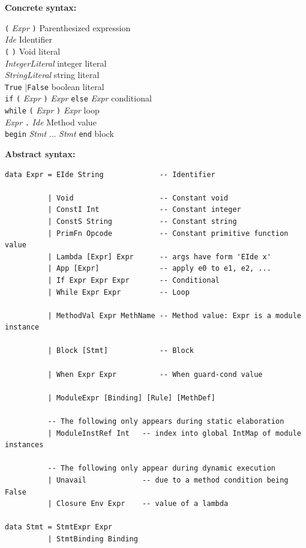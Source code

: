 \documentclass[11pt]{article}
\newcommand{\hm}{\hspace*{1em}}
\newcommand{\nterm}[1]{\emph{#1}}
\newcommand{\term}[1]{\texttt{#1}}
\newcommand{\many}[2]{#1 #2 ... #2 #1}
\newcommand{\alt}{{$\mid$}}
\newcommand{\gram}[2]{    \hm\makebox[10em][l]{\it #1}\makebox[1.5em][l]{::=}    #2}
\newcommand{\grammore}[1]{\hm\makebox[10em][l]{      }\makebox[1.5em][l]{}       #1}
\begin{document}
{\bf Concrete syntax:}

\gram{Expr}{\term{(} \nterm{Expr} \term{)}}                                               \hfill Parenthesized expression \\
\grammore{\nterm{Ide}}                                                                    \hfill Identifier \\
\grammore{\term{(} \term{)}}                                                              \hfill Void literal \\
\grammore{\nterm{IntegerLiteral}}                                                         \hfill integer literal \\
\grammore{\nterm{StringLiteral}}                                                          \hfill string literal \\
\grammore{\term{True} \alt \hm \term{False}}                                              \hfill boolean literal \\
\grammore{\term{if} \term{(} \nterm{Expr} \term{)} \nterm{Expr} \term{else} \nterm{Expr}} \hfill conditional  \\
\grammore{\term{while} \term{(} \nterm{Expr} \term{)} \nterm{Expr}}                       \hfill loop  \\
\grammore{\nterm{Expr} \term{.} \nterm{Ide}}                                              \hfill Method value \\
\grammore{\term{begin} \many{\nterm{Stmt}}{\hm} \term{end}}                               \hfill block

{\bf Abstract syntax:}

\begin{Verbatim}[frame=single, commandchars=\\\{\}]
data Expr = EIde String             -- Identifier

          | Void                    -- Constant void
          | ConstI Int              -- Constant integer
          | ConstS String           -- Constant string
          | PrimFn Opcode           -- Constant primitive function value
          | Lambda [Expr] Expr      -- args have form 'EIde x'
          | App [Expr]              -- apply e0 to e1, e2, ...
          | If Expr Expr Expr       -- Conditional
          | While Expr Expr         -- Loop

          | MethodVal Expr MethName -- Method value: Expr is a module instance

          | Block [Stmt]            -- Block

          | When Expr Expr          -- When guard-cond value

          | ModuleExpr [Binding] [Rule] [MethDef]

          -- The following only appears during static elaboration
          | ModuleInstRef Int   -- index into global IntMap of module instances

          -- The following only appear during dynamic execution
          | Unavail             -- due to a method condition being False
          | Closure Env Expr    -- value of a lambda

data Stmt = StmtExpr Expr
          | StmtBinding Binding
\end{Verbatim}
\end{document}
